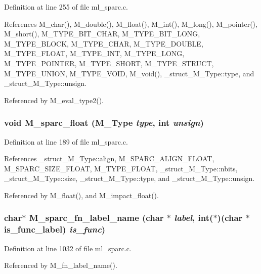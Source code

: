 Definition at line 255 of file ml\_\-sparc.c.

References M\_\-char(), M\_\-double(), M\_\-float(), M\_\-int(), M\_\-long(), M\_\-pointer(), M\_\-short(), M\_\-TYPE\_\-BIT\_\-CHAR, M\_\-TYPE\_\-BIT\_\-LONG, M\_\-TYPE\_\-BLOCK, M\_\-TYPE\_\-CHAR, M\_\-TYPE\_\-DOUBLE, M\_\-TYPE\_\-FLOAT, M\_\-TYPE\_\-INT, M\_\-TYPE\_\-LONG, M\_\-TYPE\_\-POINTER, M\_\-TYPE\_\-SHORT, M\_\-TYPE\_\-STRUCT, M\_\-TYPE\_\-UNION, M\_\-TYPE\_\-VOID, M\_\-void(), \_\-struct\_\-M\_\-Type::type, and \_\-struct\_\-M\_\-Type::unsign.

Referenced by M\_\-eval\_\-type2().
\subsubsection{\setlength{\rightskip}{0pt plus 5cm}void M\_\-sparc\_\-float (\bf{M\_\-Type} {\em type}, int {\em unsign})}\label{m__sparc_8h_00a434c2eb5c995f8b54f0893b4422f0}




Definition at line 189 of file ml\_\-sparc.c.

References \_\-struct\_\-M\_\-Type::align, M\_\-SPARC\_\-ALIGN\_\-FLOAT, M\_\-SPARC\_\-SIZE\_\-FLOAT, M\_\-TYPE\_\-FLOAT, \_\-struct\_\-M\_\-Type::nbits, \_\-struct\_\-M\_\-Type::size, \_\-struct\_\-M\_\-Type::type, and \_\-struct\_\-M\_\-Type::unsign.

Referenced by M\_\-float(), and M\_\-impact\_\-float().
\subsubsection{\setlength{\rightskip}{0pt plus 5cm}char$\ast$ M\_\-sparc\_\-fn\_\-label\_\-name (char $\ast$ {\em label}, int($\ast$)(char $\ast$is\_\-func\_\-label) {\em is\_\-func})}\label{m__sparc_8h_880a27dd1b63d819a71b50d876b967e3}




Definition at line 1032 of file ml\_\-sparc.c.

Referenced by M\_\-fn\_\-label\_\-name().

